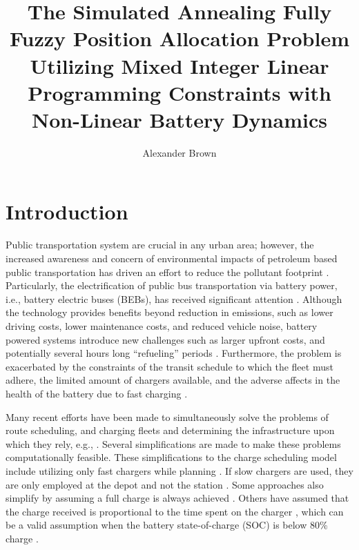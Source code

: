 \documentclass[ee,msthesis]{usuthesis}
\author{Alexander Brown}
\date{}
\title{The Simulated Annealing Fully Fuzzy Position Allocation Problem Utilizing Mixed Integer Linear Programming Constraints with Non-Linear Battery Dynamics}
\begin{document}
\maketitle
\let\ref\autoref                            %

\tableofcontents
\listoftables
\listoffigures

\let\ref\autoref                            %

\body  %

\chapter{Introduction}
\label{sec:introduction}
Public transportation system are crucial in any urban area; however, the increased awareness and concern of
environmental impacts of petroleum based public transportation has driven an effort to reduce the pollutant footprint
\cite{de-2014-simul-elect,xylia-2018-role-charg,guida-2017-zeeus-repor-europ,li-2016-batter-elect}. Particularly,
the electrification of public bus transportation via battery power, i.e., battery electric buses (BEBs), has received
significant attention \cite{li-2016-batter-elect}. Although the technology provides benefits beyond reduction in
emissions, such as lower driving costs, lower maintenance costs, and reduced vehicle noise, battery powered systems
introduce new challenges such as larger upfront costs, and potentially several hours long ``refueling'' periods
\cite{xylia-2018-role-charg,li-2016-batter-elect}. Furthermore, the problem is exacerbated by the constraints of the
transit schedule to which the fleet must adhere, the limited amount of chargers available, and the adverse affects in
the health of the battery due to fast charging \cite{lutsey-2019-updat-elect}.

Many recent efforts have been made to simultaneously solve the problems of route scheduling, and charging fleets and
determining the infrastructure upon which they rely, e.g., \cite{wei-2018-optim-spatio,sebastiani-2016-evaluat-elect,hoke-2014-accoun-lithium,wang-2017-elect-vehic}. Several simplifications are made to make these problems
computationally feasible. These simplifications to the charge scheduling model include utilizing only fast chargers
while planning \cite{wei-2018-optim-spatio,sebastiani-2016-evaluat-elect,wang-2017-optim-rechar,zhou-2020-bi-objec,yang-2018-charg-sched,wang-2017-elect-vehic,qin-2016-numer-analy,liu-2020-batter-elect}. If slow chargers are used,
they are only employed at the depot and not the station \cite{he-2020-optim-charg,tang-2019-robus-sched}. Some
approaches also simplify by assuming a full charge is always achieved
\cite{wei-2018-optim-spatio,wang-2017-elect-vehic,zhou-2020-bi-objec,wang-2017-optim-rechar}. Others have assumed
that the charge received is proportional to the time spent on the charger
\cite{liu-2020-batter-elect,yang-2018-charg-sched}, which can be a valid assumption when the battery state-of-charge
(SOC) is below 80\% charge \cite{liu-2020-batter-elect}.
\end{document}
